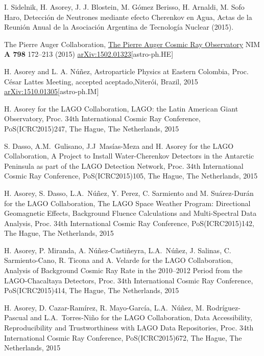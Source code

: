 \begin{etaremune}
\item {} I. Sidelnik, H. Asorey, J. J. Blostein, M. Gómez Berisso, H. Arnaldi, M. Sofo Haro, {{Detección de Neutrones mediante efecto Cherenkov en Agua}}, Actas de la Reunión Anual de la Asociación Argentina de Tecnología Nuclear (2015).

\item {}The Pierre Auger Collaboration, \href{http://dx.doi.org/10.1016/j.nima.2015.06.058}{{The Pierre Auger Cosmic Ray Observatory}} NIM {\textbf{A 798}} 172--213 (2015) \href{http://arxiv.org/abs/1502.01323}{arXiv:1502.01323}[astro-ph.HE]

\item {}H. Asorey and L. A. Núñez, {{Astroparticle Physics at Eastern Colombia}}, \en Proc.
César Lattes Meeting, \ifeng accepted \else aceptado,\fi Niterói, Brazil, 2015 \href{http://arxiv.org/abs/1510.01305}{arXiv:1510.01305}[astro-ph.IM]

\item {}H. Asorey for the LAGO Collaboration, {{LAGO: the Latin American Giant Observatory}}, \en Proc.
34th International Cosmic Ray Conference, PoS(ICRC2015)247, The Hague, The Netherlands, 2015

\item {}S. Dasso, A.M.\ Gulisano, J.J\  Masías-Meza and H. Asorey for the LAGO Collaboration, {{A Project to Install Water-Cherenkov Detectors in the Antarctic Peninsula as part of the LAGO Detection Network}}, \en Proc.
34th International Cosmic Ray Conference, PoS(ICRC2015)105, The Hague, The Netherlands, 2015

\item {}H. Asorey, S. Dasso, L.A.\ Núñez, Y. Perez, C. Sarmiento and M. Suárez-Durán for the LAGO Collaboration, {{The LAGO Space Weather Program: Directional Geomagnetic Effects, Background Fluence Calculations and Multi-Spectral Data Analysis}}, \en Proc.
34th International Cosmic Ray Conference, PoS(ICRC2015)142, The Hague, The Netherlands, 2015

\item {}H. Asorey, P. Miranda, A. Núñez-Castiñeyra, L.A.\ Núñez, J. Salinas, C. Sarmiento-Cano, R. Ticona and A. Velarde for the LAGO Collaboration, {{Analysis of Background Cosmic Ray Rate in the 2010--2012 Period from the LAGO-Chacaltaya Detectors}}, \en Proc.
34th International Cosmic Ray Conference, PoS(ICRC2015)414, The Hague, The Netherlands, 2015

\item {}H. Asorey, D. Cazar-Ramírez, R. Mayo-García, L.A.\ Núñez, M. Rodríguez-Pascual and L.A.\ Torres-Niño for the LAGO Collaboration, {{Data Accessibility, Reproducibility and Trustworthiness with LAGO Data Repositories}}, \en Proc.
34th International Cosmic Ray Conference, PoS(ICRC2015)672, The Hague, The Netherlands, 2015



\end{etaremune}
